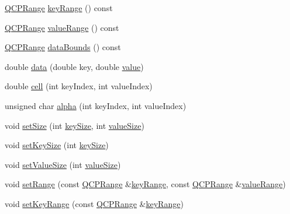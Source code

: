 \begin{DoxyCompactItemize}
\mbox{\hyperlink{class_q_c_p_range}{Q\+C\+P\+Range}} \mbox{\hyperlink{class_q_c_p_color_map_data_a1e43abd20a77b922b7cecfc69bf4dad7}{key\+Range}} () const
\item 
\mbox{\hyperlink{class_q_c_p_range}{Q\+C\+P\+Range}} \mbox{\hyperlink{class_q_c_p_color_map_data_a818e4e384aa4e5fad69ac603924394d3}{value\+Range}} () const
\item 
\mbox{\hyperlink{class_q_c_p_range}{Q\+C\+P\+Range}} \mbox{\hyperlink{class_q_c_p_color_map_data_ab7620248272c5ddd9a3f877f07179f6d}{data\+Bounds}} () const
\item 
double \mbox{\hyperlink{class_q_c_p_color_map_data_a2c33807b008cdb9e1394245c294c0eaf}{data}} (double key, double \mbox{\hyperlink{diffusion_8cpp_a4b41795815d9f3d03abfc739e666d5da}{value}})
\item 
double \mbox{\hyperlink{class_q_c_p_color_map_data_af51ecd21f347adbf87b4cce4e1f5cbd6}{cell}} (int key\+Index, int value\+Index)
\item 
unsigned char \mbox{\hyperlink{class_q_c_p_color_map_data_a4f7e6b7a97017400cbbd46f0660e68ea}{alpha}} (int key\+Index, int value\+Index)
\item 
void \mbox{\hyperlink{class_q_c_p_color_map_data_a0d9ff35c299d0478b682bfbcdd9c097e}{set\+Size}} (int \mbox{\hyperlink{class_q_c_p_color_map_data_abbda4d28de97aedce1e6e6f008a0a1f7}{key\+Size}}, int \mbox{\hyperlink{class_q_c_p_color_map_data_a8510cafea24645bbb62b5e0bfc43209f}{value\+Size}})
\item 
void \mbox{\hyperlink{class_q_c_p_color_map_data_ac7ef70e383aface34b44dbde49234b6b}{set\+Key\+Size}} (int \mbox{\hyperlink{class_q_c_p_color_map_data_abbda4d28de97aedce1e6e6f008a0a1f7}{key\+Size}})
\item 
void \mbox{\hyperlink{class_q_c_p_color_map_data_a0893c9e3914513048b45e3429ffd16f2}{set\+Value\+Size}} (int \mbox{\hyperlink{class_q_c_p_color_map_data_a8510cafea24645bbb62b5e0bfc43209f}{value\+Size}})
\item 
void \mbox{\hyperlink{class_q_c_p_color_map_data_aad9c1c7c703c1339489fc730517c83d4}{set\+Range}} (const \mbox{\hyperlink{class_q_c_p_range}{Q\+C\+P\+Range}} \&\mbox{\hyperlink{class_q_c_p_color_map_data_a1e43abd20a77b922b7cecfc69bf4dad7}{key\+Range}}, const \mbox{\hyperlink{class_q_c_p_range}{Q\+C\+P\+Range}} \&\mbox{\hyperlink{class_q_c_p_color_map_data_a818e4e384aa4e5fad69ac603924394d3}{value\+Range}})
\item 
void \mbox{\hyperlink{class_q_c_p_color_map_data_a0738c485f3c9df9ea1241b7a8bb6a86e}{set\+Key\+Range}} (const \mbox{\hyperlink{class_q_c_p_range}{Q\+C\+P\+Range}} \&\mbox{\hyperlink{class_q_c_p_color_map_data_a1e43abd20a77b922b7cecfc69bf4dad7}{key\+Range}})

\end{DoxyCompactItemize}
